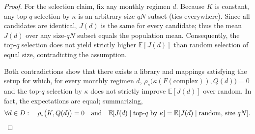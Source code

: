 \begin{proof}
For the selection claim, fix any monthly regimen $d$. Because $K$ is constant, any top-$q$ selection by $\kappa$ is an arbitrary size-$qN$ subset (ties everywhere). Since all candidates are identical, $J(d)$ is the same for every candidate; thus the mean $J(d)$ over any size-$qN$ subset equals the population mean. Consequently, the top-$q$ selection does not yield strictly higher $\mathbb{E}[J(d)]$ than random selection of equal size, contradicting the assumption.

Both contradictions show that there exists a library and mappings satisfying the setup for which, for every monthly regimen $d$, $\rho_s\bigl(\kappa(F(\mathrm{complex})), Q(d)\bigr)=0$ and the top-$q$ selection by $\kappa$ does not strictly improve $\mathbb{E}[J(d)]$ over random. In fact, the expectations are equal; summarizing,
\[
\forall d\in D:\quad \rho_s\bigl(K,Q(d)\bigr)=0\quad\text{and}\quad \mathbb{E}[J(d)\mid \text{top-}q\text{ by }\kappa]=\mathbb{E}[J(d)\mid \text{random, size }qN].\qedhere
\]
\end{proof}
